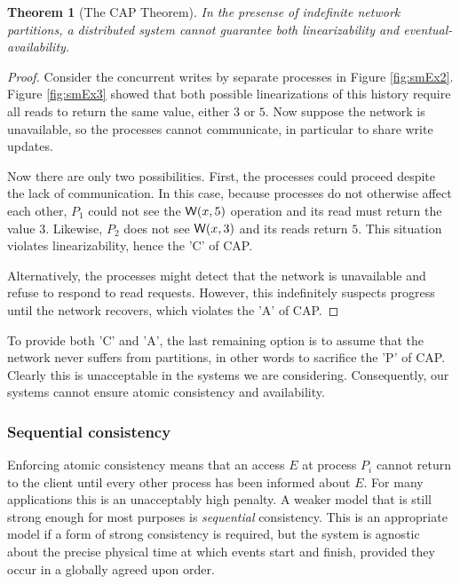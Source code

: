 \documentclass[]             %
{NASA}                       %
\newtheorem{theorem}{Theorem}[section]
\theoremstyle{definition}
\begin{document}
\begin{theorem}[The CAP Theorem]
  \label{thm:cap}
  In the presense of indefinite network partitions, a distributed system
  cannot guarantee both linearizability and eventual-availability.
\end{theorem}
\begin{proof}
  Consider the concurrent writes by separate processes in Figure
  \ref{fig:smEx2}.  Figure \ref{fig:smEx3} showed that both possible
  linearizations of this history require all reads to return the same
  value, either $3$ or $5$. Now suppose the network is unavailable, so
  the processes cannot communicate, in particular to share write
  updates.

  Now there are only two possibilities. First, the processes could
  proceed despite the lack of communication. In this case, because
  processes do not otherwise affect each other, $P_1$ could not see
  the $\mathsf{W}\!\left(x, 5\right)$ operation and its read must return the value
  $3$. Likewise, $P_2$ does not see $\mathsf{W}\!\left(x, 3\right)$ and its reads return
  $5$. This situation violates linearizability, hence the 'C' of CAP.

  Alternatively, the processes might detect that the network is
  unavailable and refuse to respond to read requests. However, this
  indefinitely suspects progress until the network recovers, which
  violates the 'A' of CAP.
\end{proof}

To provide both 'C' and 'A', the last remaining option is to assume
that the network never suffers from partitions, in other words to
sacrifice the 'P' of CAP. Clearly this is unacceptable in the systems
we are considering. Consequently, our systems cannot ensure atomic
consistency and availability.

\subsubsection{Sequential consistency}
\label{sequential-consistency}
Enforcing atomic consistency means that an access \(E\) at process
\(P_i\) cannot return to the client until every other process has been
informed about \(E\). For many applications this is an unacceptably
high penalty. A weaker model that is still strong enough for most
purposes is \emph{sequential} consistency. This is an appropriate
model if a form of strong consistency is required, but the system is
agnostic about the precise physical time at which events start and
finish, provided they occur in a globally agreed upon order.
\end{document}

